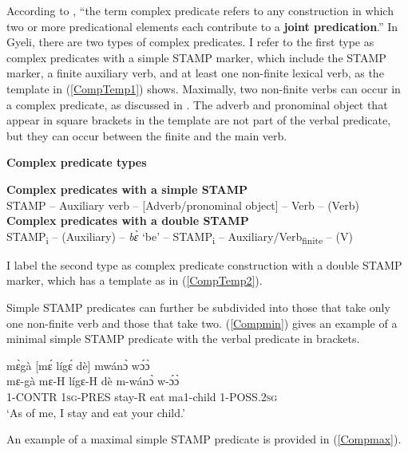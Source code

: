According to \citet[50]{butt2010}, ``the term complex predicate refers to any construction in which two or more predicational elements each contribute to a {\bfseries joint predication}.''
In Gyeli, there are two types of complex predicates. I refer to the first type as complex predicates with a simple STAMP marker, which include the STAMP marker, a finite auxiliary verb, and at least one non-finite lexical verb, as the template in (\ref{CompTemp1}) shows. Maximally, two non-finite verbs can occur in a complex predicate, as discussed in . The adverb and pronominal object that appear in square brackets in the template are not part of the verbal predicate, but they can occur between the finite and the main verb.


\begin{exe} \ex\label{CompTemp}  {\bfseries Complex predicate types}
\begin{xlist}
\ex \label{CompTemp1} {\bfseries Complex predicates with a simple STAMP}  \\
STAMP -- Auxiliary verb -- [Adverb/pronominal object] -- Verb -- (Verb)
\ex\label{CompTemp2} {\bfseries Complex predicates with a double STAMP} \\
STAMP\textsubscript{i} -- (Auxiliary) -- {\itshape bɛ̀} `be' -- STAMP\textsubscript{i} -- Auxiliary/Verb\textsubscript{finite} -- (V)
\end{xlist}
\end{exe}

\noindent I label the second type as complex predicate construction with a double STAMP marker, which has a template as in (\ref{CompTemp2}).

Simple STAMP predicates can further be subdivided into those that take only one non-finite verb and those that take two. (\ref{Compmin}) gives an example of a minimal simple STAMP predicate with the verbal predicate in brackets.

\begin{exe} 
\ex\label{Compmin}
  \glll  mɛ̀gà [mɛ́ lígɛ́ dè] mwánɔ̀ wɔ́ɔ̀ \\
        mɛ-gà mɛ-H lígɛ-H dè m-wánɔ̀ w-ɔ́ɔ̀ \\
          1-CONTR 1\textsc{sg}-PRES stay-R eat ma1-child 1-POSS.2\textsc{sg}  \\
    \trans `As of me, I stay and eat your child.'
\end{exe}

\noindent An example of a maximal simple STAMP predicate is provided in (\ref{Compmax}).

